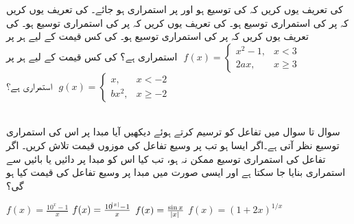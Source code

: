  کی تعریف یوں کریں  کہ    کی توسیع    ہو اور        پر   استمراری  ہو جائے۔
 کی تعریف یوں کریں کہ  پر  کی  استمراری توسیع  ہو۔
 کی تعریف یوں کریں کہ  پر  کی  استمراری توسیع  ہو۔
 کی تعریف یوں کریں کہ  پر  کی  استمراری توسیع  ہو۔
 کی کس قیمت کے لیے ہر  پر 
$\,\,f(x)=\begin{cases} x^2-1,&x<3\\ 2ax,&x\ge 3  \end{cases}\,\,$
استمراری ہے؟
 کی کس قیمت کے لیے ہر  پر 
$\,\,g(x)=\begin{cases} x,&x<-2\\ bx^2,&x\ge -2  \end{cases}\,\,$
استمراری ہے؟

\\
سوال  تا سوال  میں تفاعل  کو ترسیم کرتے ہوئے دیکھیں آیا  مبدا پر اس کی  استمراری توسیع  نظر آتی ہے۔اگر ایسا ہو تب  پر وسیع تفاعل کی موزوں قیمت تلاش کریں۔ اگر تفاعل کی استمراری توسیع  ممکن نہ ہو، تب کیا اس کو مبدا پر دائیں یا بائیں سے استمراری بنایا جا سکتا ہے اور ایسی صورت میں مبدا پر وسیع تفاعل کی قیمت کیا ہو گی؟

$f(x)=\tfrac{10^x-1}{x}$
$f(x)=\tfrac{10^{\abs{x}}-1}{x}$
$f(x)=\tfrac{\sin x}{\abs{x}}$
$f(x)=(1+2x)^{1/x}$


